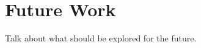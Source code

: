 \section{Future Work} \label{sec:future}
\color{red}
Talk about what should be explored for the future.

\color{black}